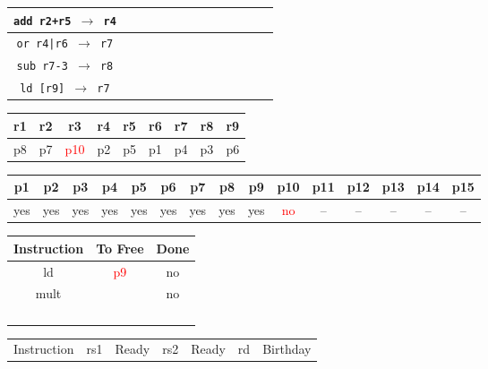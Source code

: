 \documentclass[12pt]{article}
\begin{document}
\begin{enumerate}
\begin{table}[H]
\begin{tabular}{|c|c|c|c|c|c|c|c|c|c|c|c|c|}
					\hline
					\texttt{add r2+r5 $\rightarrow$ r4} &  &  &  &  &  &  &  &  &  &  &  &\\
					\hline
					\texttt{or r4|r6 $\rightarrow$ r7} &  &  &  &  &  &  &  &  &  &  &  &\\
					\hline
					\texttt{sub r7-3 $\rightarrow$ r8} &  &  &  &  &  &  &  &  &  &  &  &\\
					\hline
					\texttt{ld [r9] $\rightarrow$ r7} &  &  &  &  &  &  &  &  &  &  &  &\\
					\hline 
				\end{tabular}
			\end{table}
			\begin{table}[H]
				\begin{tabular}{|c|c|c|c|c|c|c|c|c|}
					\hline
					r1 & r2 & r3 & r4 & r5 & r6 & r7 & r8 & r9\\
					\hline
					p8 & p7 & \textcolor{red}{p10} & p2 & p5 & p1 & p4 & p3 & p6\\
					\hline
				\end{tabular}
			\end{table}
			\begin{table}[H]
				\begin{tabular}{|c|c|c|c|c|c|c|c|c|c|c|c|c|c|c|}
					\hline
					p1 & p2 & p3 & p4 & p5 & p6 & p7 & p8 & p9 & p10 & p11 & p12 & p13 & p14 & p15\\
					\hline
					yes & yes & yes & yes & yes & yes & yes & yes & yes & \textcolor{red}{no} & -- & -- & -- & -- & --\\
					\hline
				\end{tabular}
			\end{table}
			\begin{table}[H]
				\begin{tabular}{|c|c|c|}
					\hline
					Instruction & To Free & Done\\
					\hline
					ld & \textcolor{red}{p9} & no\\
					\hline
					mult & & no\\
					\hline
					 & & \\
					\hline
					 & & \\
					\hline
					 & & \\
					\hline
					 & & \\
					\hline
				\end{tabular}
				\hfill
				\begin{tabular}{|c|c|c|c|c|c|c|}
					\hline
					Instruction & rs1 & Ready & rs2 & Ready & rd & Birthday\\

\end{tabular}
\end{table}
\end{enumerate}
\end{document}
